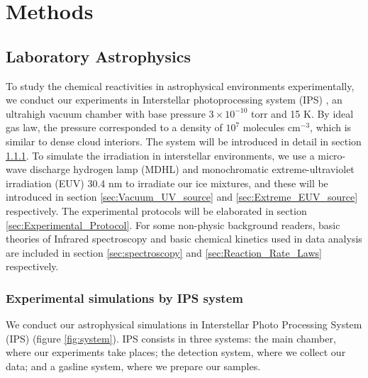 \chapter{\protect Methods}
\label{methods}

\section{Laboratory Astrophysics}
To study the chemical reactivities in astrophysical environments experimentally,
we conduct our experiments in Interstellar photoprocessing system (IPS) \cite{chen2013vacuum},
an ultrahigh vacuum chamber with base pressure $3 \times 10^{-10}$ torr and 15 K. By ideal gas law, the pressure corresponded to a density of $10^7$ molecules cm$^{-3}$, which is similar to dense cloud interiors.
The system will be introduced in detail in section \ref{sec:IPS_system}.
To simulate the irradiation in interstellar environments,
we use a micro-wave discharge hydrogen lamp (MDHL) and monochromatic extreme-ultraviolet irradiation (EUV) 30.4 nm to irradiate our ice mixtures,
and these will be introduced in section \ref{sec:Vacuum_UV_source} and \ref{sec:Extreme_EUV_source} respectively.
The experimental protocols will be elaborated in section \ref{sec:Experimental_Protocol}.
For some non-physic background readers, basic theories of Infrared spectroscopy and basic chemical kinetics used in data analysis are included in section \ref{sec:spectroscopy} and \ref{sec:Reaction_Rate_Laws} respectively.\\

\subsection{Experimental simulations by IPS system}
\label{sec:IPS_system}

We conduct our astrophysical simulations in Interstellar Photo Processing System (IPS) (figure \ref{fig:system}). IPS consists in three systems: the main chamber, where our experiments take places; the detection system, where we collect our data; and a gasline system, where we prepare our samples.


